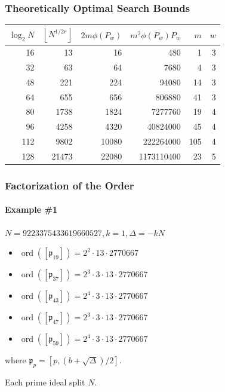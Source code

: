 \documentclass{beamer}
\DeclareMathOperator{\ord}{ord}
\newcommand{\floor}[1]{\left\lfloor #1 \right\rfloor}
\newcommand{\ideal}{\mathfrak}
\newcommand{\idealclass}[1]{\left[ \ideal #1 \right]}
\begin{document}
\begin{frame}
\frametitle{Theoretically Optimal Search Bounds}
\begin{table}
\centering
\begin{tabular}{| r | r | r | r | r | r |}
\hline
$\log_2 N$ & $\floor{N^{1/2r}}$ & $2m\phi(P_w)$ & $m^2\phi(P_w)P_w$ & $m$ & $w$ \\
\hline
16 & 13 & 16 & 480 & 1 & 3 \\
32 & 63 & 64 & 7680 & 4 & 3 \\
48 & 221 & 224 & 94080 & 14 & 3 \\
64 & 655 & 656 & 806880 & 41 & 3 \\
80 & 1738 & 1824 & 7277760 & 19 & 4 \\
96 & 4258 & 4320 & 40824000 & 45 & 4 \\
112 & 9802 & 10080 & 222264000 & 105 & 4 \\
128 & 21473 & 22080 & 1173110400 & 23 & 5 \\
\hline
\end{tabular}
\end{table}
\end{frame}


\begin{frame}
\frametitle{Factorization of the Order}
\framesubtitle{Example \#1}

$N = 9223375433619660527, k = 1, \Delta = -kN$
\begin{itemize}
\item $\ord(\idealclass{p_{19}}) = 2^2 \cdot 13 \cdot 2770667$
\item $\ord(\idealclass{p_{37}}) = 2^3 \cdot 3 \cdot 13 \cdot 2770667$
\item $\ord(\idealclass{p_{43}}) = 2^4 \cdot 3 \cdot 13 \cdot 2770667$
\item $\ord(\idealclass{p_{47}}) = 2^3 \cdot 3 \cdot 13 \cdot 2770667$
\item $\ord(\idealclass{p_{59}}) = 2^4 \cdot 3 \cdot 13 \cdot 2770667$
\end{itemize}

where $\ideal p_p = [p, (b + \sqrt\Delta)/2]$.

\bigskip
Each prime ideal split $N$.
\end{frame}
\end{document}
